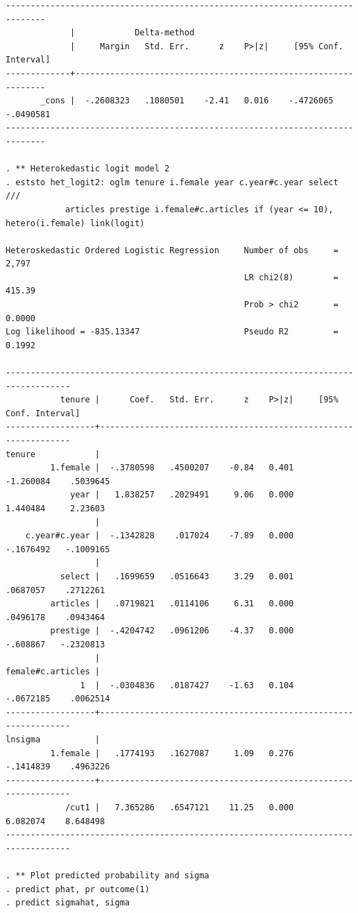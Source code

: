 \begin{verbatim}
------------------------------------------------------------------------------
             |            Delta-method
             |     Margin   Std. Err.      z    P>|z|     [95% Conf. Interval]
-------------+----------------------------------------------------------------
       _cons |  -.2608323   .1080501    -2.41   0.016    -.4726065   -.0490581
------------------------------------------------------------------------------

. ** Heterokedastic logit model 2
. eststo het_logit2: oglm tenure i.female year c.year#c.year select ///
            articles prestige i.female#c.articles if (year <= 10), hetero(i.female) link(logit)

Heteroskedastic Ordered Logistic Regression     Number of obs     =      2,797
                                                LR chi2(8)        =     415.39
                                                Prob > chi2       =     0.0000
Log likelihood = -835.13347                     Pseudo R2         =     0.1992

-----------------------------------------------------------------------------------
           tenure |      Coef.   Std. Err.      z    P>|z|     [95% Conf. Interval]
------------------+----------------------------------------------------------------
tenure            |
         1.female |  -.3780598   .4500207    -0.84   0.401    -1.260084    .5039645
             year |   1.838257   .2029491     9.06   0.000     1.440484     2.23603
                  |
    c.year#c.year |  -.1342828    .017024    -7.89   0.000    -.1676492   -.1009165
                  |
           select |   .1699659   .0516643     3.29   0.001     .0687057    .2712261
         articles |   .0719821   .0114106     6.31   0.000     .0496178    .0943464
         prestige |  -.4204742   .0961206    -4.37   0.000     -.608867   -.2320813
                  |
female#c.articles |
               1  |  -.0304836   .0187427    -1.63   0.104    -.0672185    .0062514
------------------+----------------------------------------------------------------
lnsigma           |
         1.female |   .1774193   .1627087     1.09   0.276    -.1414839    .4963226
------------------+----------------------------------------------------------------
            /cut1 |   7.365286   .6547121    11.25   0.000     6.082074    8.648498
-----------------------------------------------------------------------------------

. ** Plot predicted probability and sigma
. predict phat, pr outcome(1)
. predict sigmahat, sigma


\end{verbatim}
